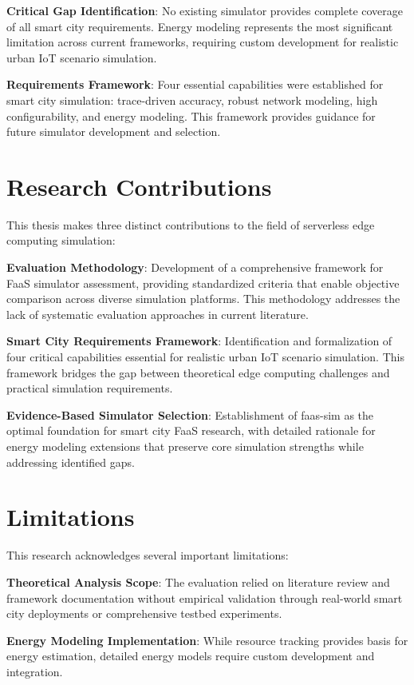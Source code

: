 \textbf{Critical Gap Identification}: No existing simulator provides complete coverage of all smart city requirements. Energy modeling represents the most significant limitation across current frameworks, requiring custom development for realistic urban IoT scenario simulation.

\textbf{Requirements Framework}: Four essential capabilities were established for smart city simulation: trace-driven accuracy, robust network modeling, high configurability, and energy modeling. This framework provides guidance for future simulator development and selection.

\section{Research Contributions}

This thesis makes three distinct contributions to the field of serverless edge computing simulation:

\textbf{Evaluation Methodology}: Development of a comprehensive framework for FaaS simulator assessment, providing standardized criteria that enable objective comparison across diverse simulation platforms. This methodology addresses the lack of systematic evaluation approaches in current literature.

\textbf{Smart City Requirements Framework}: Identification and formalization of four critical capabilities essential for realistic urban IoT scenario simulation. This framework bridges the gap between theoretical edge computing challenges and practical simulation requirements.

\textbf{Evidence-Based Simulator Selection}: Establishment of faas-sim as the optimal foundation for smart city FaaS research, with detailed rationale for energy modeling extensions that preserve core simulation strengths while addressing identified gaps.

\section{Limitations}

This research acknowledges several important limitations:

\textbf{Theoretical Analysis Scope}: The evaluation relied on literature review and framework documentation without empirical validation through real-world smart city deployments or comprehensive testbed experiments.

\textbf{Energy Modeling Implementation}: While resource tracking provides basis for energy estimation, detailed energy models require custom development and integration.

